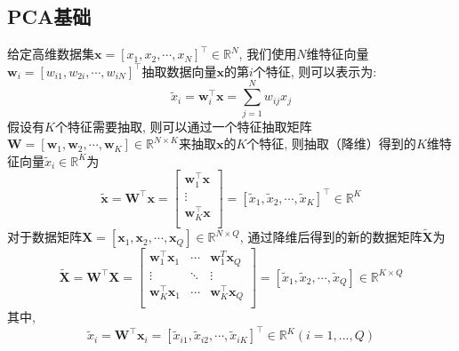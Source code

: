 \documentclass[lang=cn,10pt]{gorgeousnbook}
\numberwithin{equation}{section}%
\numberwithin{figure}{section}%
\begin{document}
\subsection{ PCA基础}
给定高维数据集$\mathbf{x}=\left[ x_1,x_2,\cdots ,x_N \right] ^{\top}\in \mathbb{R}^N$, 我们使用$N$维特征向量$\mathbf{w}_i=\left[ w_{i1},w_{2i},\cdots ,w_{iN} \right] ^{\top}$抽取数据向量$\mathbf{x}$的第$i$个特征, 则可以表示为:
\begin{equation}
\tilde{x}_i=\mathbf{w}_{i}^{\top}\mathbf{x}=\sum_{j=1}^N{w_{ij}x_j}
\end{equation}
假设有$K$个特征需要抽取, 则可以通过一个特征抽取矩阵$\mathbf{W}=\left[ \mathbf{w}_1,\mathbf{w}_2,\cdots ,\mathbf{w}_K \right]\in \mathbb{R}^{N\times K} $来抽取$\mathbf{x}$的$K$个特征, 则抽取（降维）得到的$K$维特征向量$\tilde{x}_i\in\mathbb{R}^K$为
\begin{equation}
\mathbf{\tilde{x}}=\mathbf{W}^{\top}\mathbf{x}=\left[ \begin{array}{c}
	\mathbf{w}_{1}^{\top}\mathbf{x}\\
	\vdots\\
	\mathbf{w}_{K}^{\top}\mathbf{x}\\
\end{array} \right] =\left[ \tilde{x}_1,\tilde{x}_2,\cdots ,\tilde{x}_K \right] ^{\top}\in \mathbb{R}^K
\end{equation}
对于数据矩阵$\mathbf{X}=\left[ \mathbf{x}_1,\mathbf{x}_2,\cdots ,\mathbf{x}_Q \right] \in \mathbb{R}^{N\times Q}$, 通过降维后得到的新的数据矩阵$\mathbf{\tilde{X}}$为
\begin{equation}
\mathbf{\tilde{X}}=\mathbf{W}^{\top}\mathbf{X}=\left[ \begin{matrix}
	\mathbf{w}_{1}^{\top}\mathbf{x}_1&		\cdots&		\mathbf{w}_{1}^{T}\mathbf{x}_Q\\
	\vdots&		\ddots&		\vdots\\
	\mathbf{w}_{K}^{\top}\mathbf{x}_1&		\cdots&		\mathbf{w}_{K}^{\top}\mathbf{x}_Q\\
\end{matrix} \right] =\left[ \tilde{x}_1,\tilde{x}_2,\cdots ,\tilde{x}_Q \right] \in \mathbb{R}^{K\times Q} 
\end{equation}
其中, 
\begin{equation}
\tilde{x}_i=\mathbf{W}^{\top}\mathbf{x}_i=\left[ \tilde{x}_{i1},\tilde{x}_{i2},\cdots ,\tilde{x}_{iK} \right] ^{\top}\in \mathbb{R}^K\left( i=1,...,Q \right) 
\end{equation}
\end{document}
